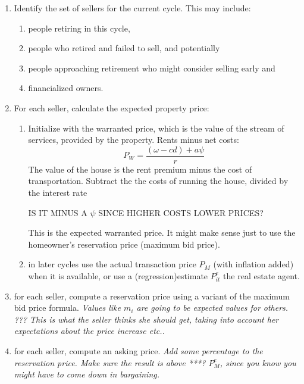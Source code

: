 \begin{enumerate}
    \item Identify the set of sellers for the current cycle. This may include:
    \begin{enumerate}
        \item people retiring in this cycle,
        \item people who retired and failed to sell, and potentially
        \item people approaching retirement who might consider selling early and
        \item financialized owners. %
    \end{enumerate}
    
    \item For each seller, calculate the expected property price: %
    \begin{enumerate}
        \item Initialize with the warranted price, which is the value of the stream of services, provided by the property. Rents minus net costs:
       \[ P_W=\frac{(\omega-{c}{d}) + {a}\psi}{r}\]
        The value of the house is the rent premium minus the cost of transportation. Subtract the the costs of running the house, divided by the interest rate
    
        IS IT MINUS A $\psi$ SINCE HIGHER COSTS LOWER PRICES?
       
        {\color{green} This is the expected warranted price. It might make sense just to use the homeowner's reservation price (maximum bid price)}.
        \item in later cycles use the actual transaction price $P_M$ (with inflation added) when it is available, or use a (regression)estimate $P_{it}^e$ the real estate agent.
    \end{enumerate}
    
    \item for each seller, compute a reservation price using a variant of the maximum bid price formula. 
    {\color{green}\textit{Values like $m_i$ are going to be expected values for others.  ??? }}
    \textit{This is what the seller thinks she should get, taking into account her expectations about the price increase etc..}
    
    \item for each seller, compute an asking price. 
    \textit{Add some percentage to the reservation price. Make sure the result is above ***? $P_M^e$, since you know you might have to come down in bargaining.}   
    

\end{enumerate}
